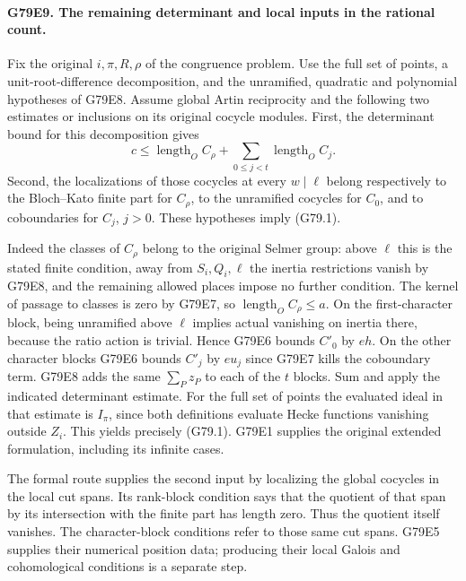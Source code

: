 \paragraph{G79E9. The remaining determinant and local inputs in the rational count.}
Fix the original $i,\pi,R,\rho$ of the congruence problem.
Use the full set of points, a unit-root-difference decomposition,
and the unramified, quadratic and polynomial hypotheses of G79E8.
Assume global Artin reciprocity and the following two estimates or
inclusions on its original cocycle modules. First, the determinant
bound for this decomposition gives
\[
 c\le\operatorname{length}_O C_\rho+
             \sum_{0\le j<t}\operatorname{length}_O C_j .
\]
Second, the localizations of those cocycles at every $w\mid\ell$
belong respectively to the Bloch--Kato finite part for $C_\rho$,
to the unramified cocycles for $C_0$, and to coboundaries for
$C_j$, $j>0$. These hypotheses imply (G79.1).

Indeed the classes of $C_\rho$ belong to the original Selmer
group: above $\ell$ this is the stated finite condition, away from
$S_i,Q_i,\ell$ the inertia restrictions vanish by G79E8, and
the remaining allowed places impose no further condition.
The kernel of passage to classes is zero by G79E7, so
$\operatorname{length}_O C_\rho\le a$. On the first-character
block, being unramified above $\ell$ implies actual vanishing on
inertia there, because the ratio action is trivial. Hence G79E6
bounds $C'_0$ by $eh$. On the other character blocks G79E6 bounds
$C'_j$ by $e u_j$ since G79E7 kills the coboundary term.
G79E8 adds the same $\sum_P z_P$ to each of the $t$ blocks.
Sum and apply the indicated determinant estimate. For the full
set of points the evaluated ideal in that estimate is $I_\pi$,
since both definitions evaluate Hecke functions vanishing outside
$Z_i$. This yields precisely (G79.1). G79E1 supplies the original
extended formulation, including its infinite cases.

The formal route supplies the second input by localizing the global
cocycles in the local cut spans. Its rank-block condition says that
the quotient of that span by its intersection with the finite part
has length zero. Thus the quotient itself vanishes.
The character-block conditions refer to those same cut spans.
G79E5 supplies their numerical position data; producing their
local Galois and cohomological conditions is a separate step.

